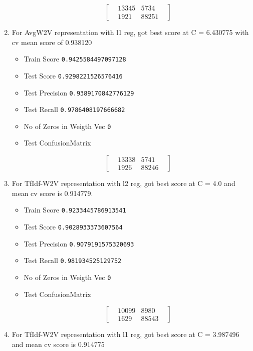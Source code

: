 \documentclass[11pt]{article}
\providecommand{\tightlist}{%
      \setlength{\itemsep}{0pt}\setlength{\parskip}{0pt}}
\begin{document}
\begin{enumerate}
\begin{itemize}
    \begin{equation}
    \begin{bmatrix}
    & 13345 & 5734 &  \\
    & 1921 & 88251 & 
    \end{bmatrix}
    \end{equation}
  \end{itemize}
\item
  For AvgW2V representation with l1 reg, got best score at C = 6.430775
  with cv mean score of 0.938120

  \begin{itemize}
  \tightlist
  \item
    Train Score \texttt{0.9425584497097128}
  \item
    Test Score \texttt{0.9298221526576416}
  \item
    Test Precision \texttt{0.9389170842776129}
  \item
    Test Recall \texttt{0.9786408197666682}
  \item
    No of Zeros in Weigth Vec \texttt{0}
  \item
    Test ConfusionMatrix

    \begin{equation}
    \begin{bmatrix}
    & 13338 & 5741 &  \\
    & 1926 & 88246 & 
    \end{bmatrix}
    \end{equation}
  \end{itemize}
\item
  For TfIdf-W2V representation with l2 reg, got best score at C = 4.0
  and mean cv score is 0.914779.

  \begin{itemize}
  \tightlist
  \item
    Train Score \texttt{0.9233445786913541}
  \item
    Test Score \texttt{0.9028933373607564}
  \item
    Test Precision \texttt{0.9079191575320693}
  \item
    Test Recall \texttt{0.981934525129752}
  \item
    No of Zeros in Weigth Vec \texttt{0}
  \item
    Test ConfusionMatrix

    \begin{equation}
    \begin{bmatrix}
    & 10099 & 8980 &  \\
    & 1629 & 88543 & 
    \end{bmatrix}
    \end{equation}
  \end{itemize}
\item
  For TfIdf-W2V representation with l1 reg, got best score at C =
  3.987496 and mean cv score is 0.914775


\end{enumerate}
\end{document}
